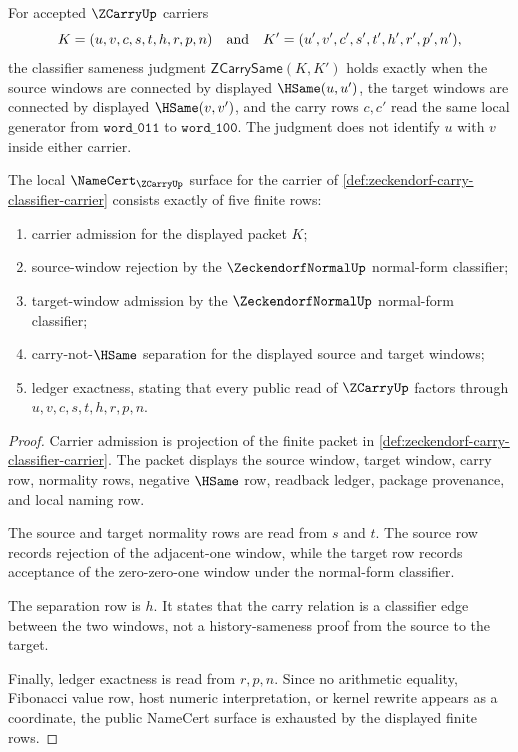 \begin{definition}
\label{def:zeckendorf-carry-classifier-same}
For accepted $\ZCarryUp$ carriers
$$
K=(u,v,c,s,t,h,r,p,n)
\quad\hbox{and}\quad
K'=(u',v',c',s',t',h',r',p',n'),
$$
the classifier sameness judgment $\mathsf{ZCarrySame}(K,K')$ holds exactly when the source windows are connected by displayed $\HSame(u,u')$, the target windows are connected by displayed $\HSame(v,v')$, and the carry rows $c,c'$ read the same local generator from $\mathtt{word\_011}$ to $\mathtt{word\_100}$. The judgment does not identify $u$ with $v$ inside either carrier.
\end{definition}

\begin{theorem}
\label{thm:zeckendorf-carry-classifier-namecert-obligations}
The local $\NameCert_{\ZCarryUp}$ surface for the carrier of \autoref{def:zeckendorf-carry-classifier-carrier} consists exactly of five finite rows:
\begin{enumerate}
\item carrier admission for the displayed packet $K$;
\item source-window rejection by the $\ZeckendorfNormalUp$ normal-form classifier;
\item target-window admission by the $\ZeckendorfNormalUp$ normal-form classifier;
\item carry-not-$\HSame$ separation for the displayed source and target windows;
\item ledger exactness, stating that every public read of $\ZCarryUp$ factors through $u,v,c,s,t,h,r,p,n$.
\end{enumerate}
\end{theorem}
\begin{proof}
Carrier admission is projection of the finite packet in \autoref{def:zeckendorf-carry-classifier-carrier}. The packet displays the source window, target window, carry row, normality rows, negative $\HSame$ row, readback ledger, package provenance, and local naming row.

The source and target normality rows are read from $s$ and $t$. The source row records rejection of the adjacent-one window, while the target row records acceptance of the zero-zero-one window under the normal-form classifier.

The separation row is $h$. It states that the carry relation is a classifier edge between the two windows, not a history-sameness proof from the source to the target.

Finally, ledger exactness is read from $r,p,n$. Since no arithmetic equality, Fibonacci value row, host numeric interpretation, or kernel rewrite appears as a coordinate, the public NameCert surface is exhausted by the displayed finite rows.
\end{proof}


